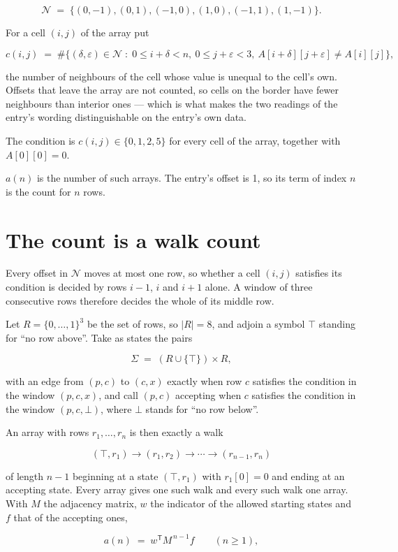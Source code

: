 \documentclass[11pt]{article}
\theoremstyle{definition}
\begin{document}
\[\mathcal{N} \;=\; \{(0,-1), (0,1), (-1,0), (1,0), (-1,1), (1,-1)\}.\]

For a cell $(i,j)$ of the array put

\[c(i,j) \;=\; \#\bigl\{(\delta,\varepsilon)\in\mathcal{N} \;:\; 0\le i+\delta<n,\ 0\le j+\varepsilon<3,\ A[i+\delta][j+\varepsilon] \neq A[i][j]\bigr\},\]

the number of neighbours of the cell whose value is unequal to the cell's own. Offsets that leave the array are not counted, so cells on the border have fewer neighbours than interior ones --- which is what makes the two readings of the entry's wording distinguishable on the entry's own data.

The condition is $c(i,j) \in \{0, 1, 2, 5\}$ for every cell of the array, together with $A[0][0]=0$.

$a(n)$ is the number of such arrays. The entry's offset is 1, so its term of index $n$ is the count for $n$ rows.

\section{The count is a walk count}

Every offset in $\mathcal{N}$ moves at most one row, so whether a cell $(i,j)$ satisfies its condition is decided by rows $i-1$, $i$ and $i+1$ alone. A window of three consecutive rows therefore decides the whole of its middle row.

Let $R = \{0,\dots,1\}^{3}$ be the set of rows, so $|R| = 8$, and adjoin a symbol $\top$ standing for ``no row above''. Take as states the pairs

\[\Sigma \;=\; (R \cup \{\top\}) \times R,\]

with an edge from $(p,c)$ to $(c,x)$ exactly when row $c$ satisfies the condition in the window $(p,c,x)$, and call $(p,c)$ accepting when $c$ satisfies the condition in the window $(p,c,\bot)$, where $\bot$ stands for ``no row below''.

An array with rows $r_1,\dots,r_n$ is then exactly a walk

\[(\top,r_1) \to (r_1,r_2) \to \cdots \to (r_{n-1},r_n)\]

of length $n-1$ beginning at a state $(\top,r_1)$ with $r_1[0]=0$ and ending at an accepting state. Every array gives one such walk and every such walk one array. With $M$ the adjacency matrix, $w$ the indicator of the allowed starting states and $f$ that of the accepting ones,

\[a(n) \;=\; w^{\mathsf T} M^{\,n-1} f \qquad (n \ge 1),\]
\end{document}
